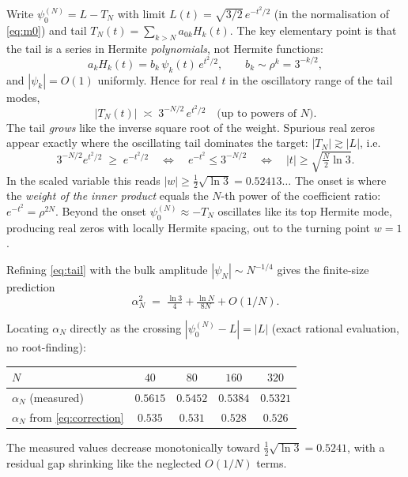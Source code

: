 \documentclass[11pt]{article}
\theoremstyle{remark}
\begin{document}
Write $\psi_0^{(N)} = L - T_N$ with limit $L(t) = \sqrt{3/2}\, e^{-t^2/2}$ (in the normalisation of \eqref{eq:m0}) and tail $T_N(t) = \sum_{k > N} a_{0k} H_k(t)$. The key elementary point is that the tail is a series in Hermite \emph{polynomials}, not Hermite functions:
\[
a_k H_k(t) = b_k\, \psi_k(t)\, e^{t^2/2}, \qquad b_k \sim \rho^k = 3^{-k/2},
\]
and $|\psi_k| = O(1)$ uniformly. Hence for real $t$ in the oscillatory range of the tail modes,
\begin{equation}
|T_N(t)| \;\asymp\; 3^{-N/2}\, e^{t^2/2} \quad\text{(up to powers of $N$)}.
\label{eq:tail}
\end{equation}
The tail \emph{grows} like the inverse square root of the weight. Spurious real zeros appear exactly where the oscillating tail dominates the target: $|T_N| \gtrsim |L|$, i.e.
\[
3^{-N/2} e^{t^2/2} \;\ge\; e^{-t^2/2}
\quad\Longleftrightarrow\quad
e^{-t^2} \le 3^{-N/2}
\quad\Longleftrightarrow\quad
|t| \ge \sqrt{\tfrac{N}{2}\ln 3}.
\]
In the scaled variable this reads $|w| \ge \frac12\sqrt{\ln 3} = 0.52413\ldots$ The onset is where the \emph{weight of the inner product} equals the $N$-th power of the coefficient ratio: $e^{-t^2} = \rho^{2N}$. Beyond the onset $\psi_0^{(N)} \approx -T_N$ oscillates like its top Hermite mode, producing real zeros with locally Hermite spacing, out to the turning point $w = 1$.

Refining \eqref{eq:tail} with the bulk amplitude $|\psi_N| \sim N^{-1/4}$ gives the finite-size prediction
\begin{equation}
\alpha_N^2 \;=\; \tfrac{\ln 3}{4} + \tfrac{\ln N}{8N} + O(1/N).
\label{eq:correction}
\end{equation}

Locating $\alpha_N$ directly as the crossing $|{\psi_0^{(N)} - L}| = |L|$ (exact rational evaluation, no root-finding):

\begin{center}
\begin{tabular}{lcccc}
\toprule
$N$ & $40$ & $80$ & $160$ & $320$ \\
\midrule
$\alpha_N$ (measured) & $0.5615$ & $0.5452$ & $0.5384$ & $0.5321$ \\
$\alpha_N$ from \eqref{eq:correction} & $0.535$ & $0.531$ & $0.528$ & $0.526$ \\
\bottomrule
\end{tabular}
\end{center}

The measured values decrease monotonically toward $\frac12\sqrt{\ln 3} = 0.5241$, with a residual gap shrinking like the neglected $O(1/N)$ terms.
\end{document}

